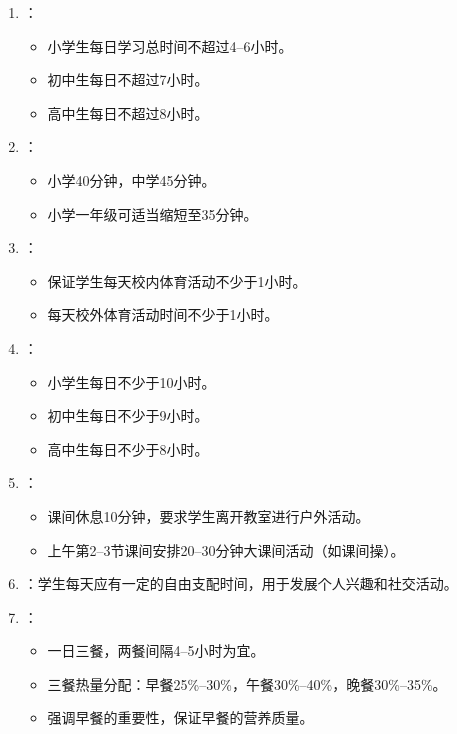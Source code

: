 \begin{keybox}
\begin{enumerate}[leftmargin=*]
    \item {}：
    \begin{itemize}
        \item 小学生每日学习总时间不超过4--6小时。
        \item 初中生每日不超过7小时。
        \item 高中生每日不超过8小时。
    \end{itemize}
    \item {}：
    \begin{itemize}
        \item 小学40分钟，中学45分钟。
        \item 小学一年级可适当缩短至35分钟。
    \end{itemize}
    \item {}：
    \begin{itemize}
        \item 保证学生每天校内体育活动不少于1小时。
        \item 每天校外体育活动时间不少于1小时。
    \end{itemize}
    \item {}：
    \begin{itemize}
        \item 小学生每日不少于10小时。
        \item 初中生每日不少于9小时。
        \item 高中生每日不少于8小时。
    \end{itemize}
    \item {}：
    \begin{itemize}
        \item 课间休息10分钟，要求学生离开教室进行户外活动。
        \item 上午第2--3节课间安排20--30分钟大课间活动（如课间操）。
    \end{itemize}
    \item {}：学生每天应有一定的自由支配时间，用于发展个人兴趣和社交活动。
    \item {}：
    \begin{itemize}
        \item 一日三餐，两餐间隔4--5小时为宜。
        \item 三餐热量分配：早餐25\%--30\%，午餐30\%--40\%，晚餐30\%--35\%。
        \item 强调早餐的重要性，保证早餐的营养质量。
    \end{itemize}
\end{enumerate}


\end{keybox}
